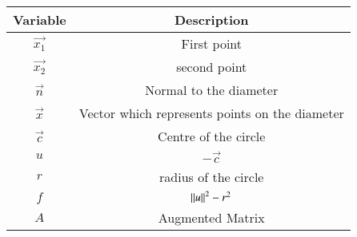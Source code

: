 \begin{tabular}[12pt]{ |c|c|}
    \hline
    \textbf{Variable} & \textbf{Description}\\ 
    \hline
    $\vec{x_1}$ & First point\\
    \hline
    $\vec{x_2}$ & second point\\
    \hline
    $\vec{n}$ & Normal to the diameter\\
    \hline
    $\vec{x}$ & Vector which represents points on the diameter\\
    \hline
    $\vec{c}$ & Centre of the circle\\
    \hline
    $u$ & $-\vec{c}$\\
    \hline
    $r$ & radius of the circle\\
    \hline
    $f$ & $\left\lVert u\right\rVert^2-r^2$\\
    \hline
    $A$ & Augmented Matrix\\
    \hline
    \end{tabular}
